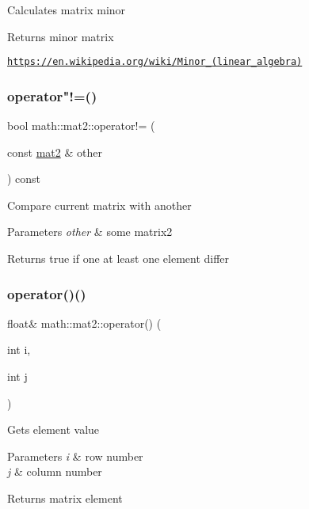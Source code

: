 Calculates matrix minor \begin{DoxyReturn}{Returns}
minor matrix
\end{DoxyReturn}
\href{https://en.wikipedia.org/wiki/Minor_(linear_algebra)}{\tt https\+://en.\+wikipedia.\+org/wiki/\+Minor\+\_\+(linear\+\_\+algebra)} \mbox{\label{structmath_1_1mat2_aef4aa6b1daded9861c6efd4f5e6366b8}} 
\subsubsection{\texorpdfstring{operator"!=()}{operator!=()}}
{\footnotesize\ttfamily bool math\+::mat2\+::operator!= (\begin{DoxyParamCaption}\item[{const \hyperlink{structmath_1_1mat2}{mat2} \&}]{other }\end{DoxyParamCaption}) const\hspace{0.3cm}{\ttfamily [inline]}}

Compare current matrix with another 
\begin{DoxyParams}{Parameters}
{\em other} & some matrix2 \\
\hline
\end{DoxyParams}
\begin{DoxyReturn}{Returns}
true if one at least one element differ 
\end{DoxyReturn}
\mbox{\label{structmath_1_1mat2_a59d375076b3309ce5d0054c60a6f1530}} 
\subsubsection{\texorpdfstring{operator()()}{operator()()}\hspace{0.1cm}{\footnotesize\ttfamily [1/2]}}
{\footnotesize\ttfamily float\& math\+::mat2\+::operator() (\begin{DoxyParamCaption}\item[{int}]{i,  }\item[{int}]{j }\end{DoxyParamCaption})\hspace{0.3cm}{\ttfamily [inline]}}

Gets element value 
\begin{DoxyParams}{Parameters}
{\em i} & row number \\
\hline
{\em j} & column number \\
\hline
\end{DoxyParams}
\begin{DoxyReturn}{Returns}
matrix element 
\end{DoxyReturn}
\mbox{\label{structmath_1_1mat2_af7ba9cf2139642b4cdc7b9332797992b}} 
